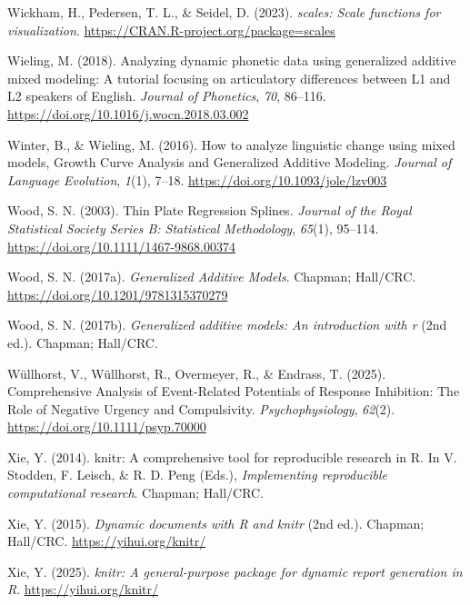 \documentclass[
  doc,
  floatsintext,
  longtable,
  a4paper,
  nolmodern,
  notxfonts,
  notimes,
  donotrepeattitle,
  colorlinks=true,linkcolor=blue,citecolor=blue,urlcolor=blue]{apa7}
\newlength{\cslhangindent}
\newenvironment{CSLReferences}[2] %
 {\begin{list}{}{%
  \setlength{\itemindent}{0pt}
  \setlength{\leftmargin}{0pt}
  \setlength{\parsep}{0pt}
  \ifodd #1
   \setlength{\leftmargin}{\cslhangindent}
   \setlength{\itemindent}{-1\cslhangindent}
  \fi
  \setlength{\itemsep}{#2\baselineskip}}}
 {\end{list}}
\begin{document}
\begin{CSLReferences}{1}{0}
Wickham, H., Pedersen, T. L., \& Seidel, D. (2023). \emph{{scales}:
Scale functions for visualization}.
\url{https://CRAN.R-project.org/package=scales}

Wieling, M. (2018). Analyzing dynamic phonetic data using generalized
additive mixed modeling: A tutorial focusing on articulatory differences
between L1 and L2 speakers of English. \emph{Journal of Phonetics},
\emph{70}, 86--116. \url{https://doi.org/10.1016/j.wocn.2018.03.002}

Winter, B., \& Wieling, M. (2016). How to analyze linguistic change
using mixed models, Growth Curve Analysis and Generalized Additive
Modeling. \emph{Journal of Language Evolution}, \emph{1}(1), 7--18.
\url{https://doi.org/10.1093/jole/lzv003}

Wood, S. N. (2003). Thin Plate Regression Splines. \emph{Journal of the
Royal Statistical Society Series B: Statistical Methodology},
\emph{65}(1), 95--114. \url{https://doi.org/10.1111/1467-9868.00374}

Wood, S. N. (2017a). \emph{Generalized Additive Models}. Chapman;
Hall/CRC. \url{https://doi.org/10.1201/9781315370279}

Wood, S. N. (2017b). \emph{Generalized additive models: An introduction
with r} (2nd ed.). Chapman; Hall/CRC.

Wüllhorst, V., Wüllhorst, R., Overmeyer, R., \& Endrass, T. (2025).
Comprehensive Analysis of Event{-}Related Potentials of Response
Inhibition: The Role of Negative Urgency and Compulsivity.
\emph{Psychophysiology}, \emph{62}(2).
\url{https://doi.org/10.1111/psyp.70000}

Xie, Y. (2014). {knitr}: A comprehensive tool for reproducible research
in {R}. In V. Stodden, F. Leisch, \& R. D. Peng (Eds.),
\emph{Implementing reproducible computational research}. Chapman;
Hall/CRC.

Xie, Y. (2015). \emph{Dynamic documents with {R} and knitr} (2nd ed.).
Chapman; Hall/CRC. \url{https://yihui.org/knitr/}

Xie, Y. (2025). \emph{{knitr}: A general-purpose package for dynamic
report generation in {R}}. \url{https://yihui.org/knitr/}


\end{CSLReferences}
\end{document}
